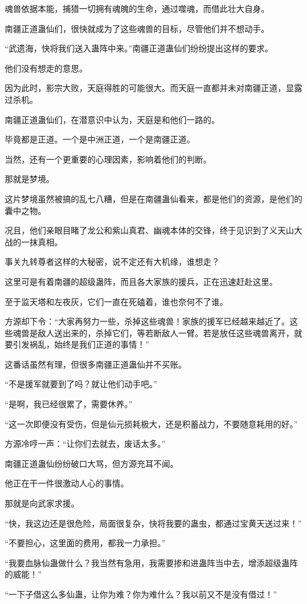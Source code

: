 \begin{this_body}
魂兽依据本能，捕猎一切拥有魂魄的生命，通过噬魂，而借此壮大自身。

南疆正道蛊仙们，很快就成为了这些魂兽的目标，尽管他们并不想动手。

“武遗海，快将我们送入蛊阵中来。”南疆正道蛊仙们纷纷提出这样的要求。

他们没有想走的意思。

因为此时，影宗大败，天庭得胜的可能很大。而天庭一直都并未对南疆正道，显露过杀机。

南疆正道蛊仙们，在潜意识中认为，天庭是和他们一路的。

毕竟都是正道。一个是中洲正道，一个是南疆正道。

当然，还有一个更重要的心理因素，影响着他们的判断。

那就是梦境。

这片梦境虽然被搞的乱七八糟，但是在南疆蛊仙看来，都是他们的资源，是他们的囊中之物。

况且，他们亲眼目睹了龙公和紫山真君、幽魂本体的交锋，终于见识到了义天山大战的一抹真相。

事关九转尊者这样的大秘密，说不定还有大机缘，谁想走？

这里可是有着南疆的超级蛊阵，而且各大家族的援兵，正在迅速赶赴这里。

至于监天塔和左夜灰，它们一直在死磕着，谁也奈何不了谁。

方源却下令：“大家再努力一些，杀掉这些魂兽！家族的援军已经越来越近了。这些魂兽是敌人送出来的，杀掉它们，等若断敌人一臂。若是放任这些魂兽离开，就要引发祸乱，始终是我们正道的事情！”

这番话虽然有理，但很多南疆正道蛊仙并不买账。

“不是援军就要到了吗？就让他们动手吧。”

“是啊，我已经很累了，需要休养。”

“这一次即便没有受伤，但是仙元损耗极大，还是积蓄战力，不要随意耗用的好。”

方源冷哼一声：“让你们去就去，废话太多。”

南疆正道蛊仙纷纷破口大骂，但方源充耳不闻。

他正在干一件很激动人心的事情。

那就是向武家求援。

“快，我这边还是很危险，局面很复杂，快将我要的蛊虫，都通过宝黄天送过来！”

“不要担心，这里面的费用，都我一力承担。”

“我要血脉仙蛊做什么？我当然有急用，我需要掺和进蛊阵当中去，增添超级蛊阵的威能！”

“一下子借这么多仙蛊，让你为难？你为难什么？我以前又不是没有借过！”


\end{this_body}
